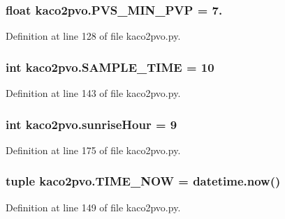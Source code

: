 \subsubsection[{P\+V\+S\+\_\+\+M\+I\+N\+\_\+\+P\+V\+P}]{\setlength{\rightskip}{0pt plus 5cm}float kaco2pvo.\+P\+V\+S\+\_\+\+M\+I\+N\+\_\+\+P\+V\+P = 7.}\label{namespacekaco2pvo_a254420e2cbb7034d7e494c8176a724ad}


Definition at line 128 of file kaco2pvo.\+py.

\hypertarget{namespacekaco2pvo_aa1171dcdb6218f78cd24095e33df03b0}{}
\subsubsection[{S\+A\+M\+P\+L\+E\+\_\+\+T\+I\+M\+E}]{\setlength{\rightskip}{0pt plus 5cm}int kaco2pvo.\+S\+A\+M\+P\+L\+E\+\_\+\+T\+I\+M\+E = 10}\label{namespacekaco2pvo_aa1171dcdb6218f78cd24095e33df03b0}


Definition at line 143 of file kaco2pvo.\+py.

\hypertarget{namespacekaco2pvo_adbaf401038663576c5820bae830b8c66}{}
\subsubsection[{sunrise\+Hour}]{\setlength{\rightskip}{0pt plus 5cm}int kaco2pvo.\+sunrise\+Hour = 9}\label{namespacekaco2pvo_adbaf401038663576c5820bae830b8c66}


Definition at line 175 of file kaco2pvo.\+py.

\hypertarget{namespacekaco2pvo_ad285210c5c2a47f71ea80963c7ec5659}{}
\subsubsection[{T\+I\+M\+E\+\_\+\+N\+O\+W}]{\setlength{\rightskip}{0pt plus 5cm}tuple kaco2pvo.\+T\+I\+M\+E\+\_\+\+N\+O\+W = datetime.\+now()}\label{namespacekaco2pvo_ad285210c5c2a47f71ea80963c7ec5659}


Definition at line 149 of file kaco2pvo.\+py.

